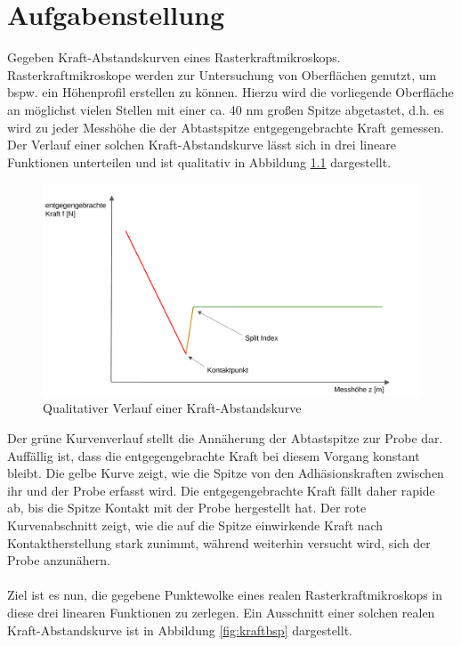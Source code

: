 \chapter{Aufgabenstellung}
Gegeben Kraft-Abstandskurven eines Rasterkraftmikroskops. Rasterkraftmikroskope werden zur Untersuchung von Oberflächen genutzt, um bspw. ein Höhenprofil erstellen zu können. Hierzu wird die vorliegende Oberfläche an möglichst vielen Stellen mit einer ca. 40 nm großen Spitze abgetastet, d.h. es wird zu jeder Messhöhe die der Abtastspitze entgegengebrachte Kraft gemessen.
Der Verlauf einer solchen Kraft-Abstandskurve lässt sich in drei lineare Funktionen unterteilen und ist qualitativ in Abbildung \ref{fig:kraftqual} dargestellt.

\begin{figure}[h!]
\centering
\includegraphics[scale=0.5]{qual.pdf}
\caption{Qualitativer Verlauf einer Kraft-Abstandskurve}
\label{fig:kraftqual}
\end{figure}

Der grüne Kurvenverlauf stellt die Annäherung der Abtastspitze zur Probe dar. Auffällig ist, dass die entgegengebrachte Kraft bei diesem Vorgang konstant bleibt.
Die gelbe Kurve zeigt, wie die Spitze von den Adhäsionskraften zwischen ihr und der Probe erfasst wird. Die entgegengebrachte Kraft fällt daher rapide ab, bis die Spitze Kontakt mit der Probe hergestellt hat.
Der rote Kurvenabschnitt zeigt, wie die auf die Spitze einwirkende Kraft nach Kontaktherstellung stark zunimmt, während weiterhin versucht wird, sich der Probe anzunähern.
\\\\
Ziel ist es nun, die gegebene Punktewolke eines realen Rasterkraftmikroskops in diese drei linearen Funktionen zu zerlegen.
Ein Ausschnitt einer solchen realen Kraft-Abstandskurve ist in Abbildung \ref{fig:kraftbsp} dargestellt.



